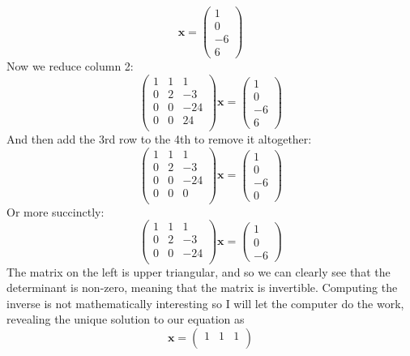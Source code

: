 \documentclass{article}
\newcommand{\chapternumber}{2}
\newenvironment{QandA}{\begin{enumerate}[label=\chapternumber.\arabic*]\bfseries\boldmath}
	{\end{enumerate}}
\newenvironment{answered}{\par\bigskip\normalfont\unboldmath}{}
\begin{document}
\begin{QandA}
\begin{answered}
\[			\textbf{x}
			=
			\begin{pmatrix}
				1 \\ 0 \\ -6 \\ 6
			\end{pmatrix}
			\]
			Now we reduce column 2:
						\[
			\begin{pmatrix}
				1 & 1 & 1 \\
				0 & 2 & -3 \\
				0 & 0 & -24 \\
				0 & 0 & 24 \\
			\end{pmatrix}
			\textbf{x}
			=
			\begin{pmatrix}
				1 \\ 0 \\ -6 \\ 6
			\end{pmatrix}
			\]
			And then add the 3rd row to the 4th to remove it altogether:
			\[
			\begin{pmatrix}
				1 & 1 & 1 \\
				0 & 2 & -3 \\
				0 & 0 & -24 \\
				0 & 0 & 0 \\
			\end{pmatrix}
			\textbf{x}
			=
			\begin{pmatrix}
				1 \\ 0 \\ -6 \\ 0
			\end{pmatrix}
			\]
			Or more succinctly:
			\[
			\begin{pmatrix}
				1 & 1 & 1 \\
				0 & 2 & -3 \\
				0 & 0 & -24 \\
			\end{pmatrix}
			\textbf{x}
			=
			\begin{pmatrix}
				1 \\ 0 \\ -6
			\end{pmatrix}
			\]
			The matrix on the left is upper triangular, and so we can clearly see that the determinant is non-zero, meaning that the matrix is invertible. Computing the inverse is not mathematically interesting so I will let the computer do the work, revealing the unique solution to our equation as
			\[\textbf{x}
			=
			\begin{pmatrix}
				1 & 1 & 1 \\

\end{pmatrix}\]
\end{answered}
\end{QandA}
\end{document}
